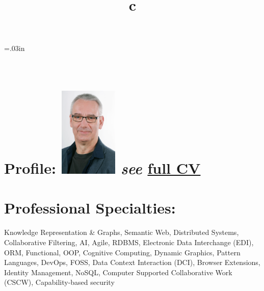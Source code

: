 \documentclass[line,margin,hidelinks]{res}
\begin{document}


\begin{resume}

\sectionskip=.03in

\begin{format}
\title{c}\\
\end{format}


\section{Profile:
  \newline   \newline
  \includegraphics[width=1.1in]{smurp_smile_color.eps}
  \footnotesize{\textit{see} \href{\cvUrl}{full CV}}
}



\section{Professional Specialties:}
\begin{par}
Knowledge Representation \& Graphs,
Semantic Web,
Distributed Systems,
Collaborative Filtering,
AI,
Agile,
RDBMS,
Electronic Data Interchange (EDI),
ORM,
Functional,
OOP,
Cognitive Computing,
Dynamic Graphics,
Pattern Languages,
DevOps,
FOSS,
Data Context Interaction (DCI),
Browser Extensions,
Identity Management,
NoSQL,
Computer Supported Collaborative Work (CSCW),
Capability-based security
\end{par}


\end{resume}
\end{document}
